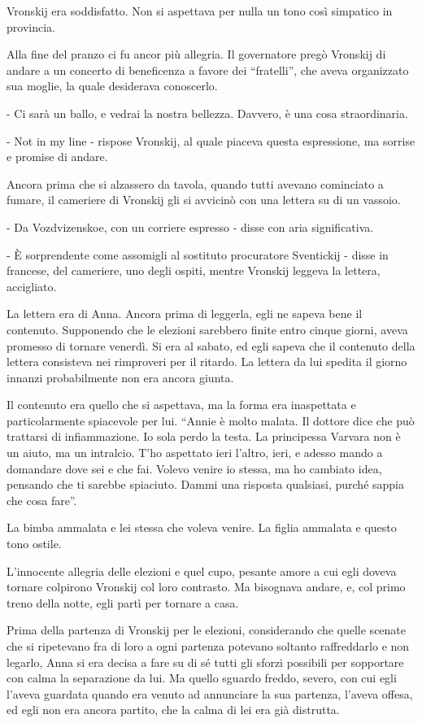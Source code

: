 Vronskij era soddisfatto. Non si aspettava per nulla un tono così simpatico in provincia. 

Alla fine del pranzo ci fu ancor più allegria. Il governatore pregò Vronskij di andare a un concerto di beneficenza a favore dei ``fratelli'', che aveva organizzato sua moglie, la quale desiderava conoscerlo. 

- Ci sarà un ballo, e vedrai la nostra bellezza. Davvero, è una cosa straordinaria. 

- Not in my line - rispose Vronskij, al quale piaceva questa espressione, ma sorrise e promise di andare. 

Ancora prima che si alzassero da tavola, quando tutti avevano cominciato a fumare, il cameriere di Vronskij gli si avvicinò con una lettera su di un vassoio. 

- Da Vozdvizenskoe, con un corriere espresso - disse con aria significativa. 

- È sorprendente come assomigli al sostituto procuratore Sventickij - disse in francese, del cameriere, uno degli ospiti, mentre Vronskij leggeva la lettera, accigliato. 

La lettera era di Anna. Ancora prima di leggerla, egli ne sapeva bene il contenuto. Supponendo che le elezioni sarebbero finite entro cinque giorni, aveva promesso di tornare venerdì. Si era al sabato, ed egli sapeva che il contenuto della lettera consisteva nei rimproveri per il ritardo. La lettera da lui spedita il giorno innanzi probabilmente non era ancora giunta. 

Il contenuto era quello che si aspettava, ma la forma era inaspettata e particolarmente spiacevole per lui. ``Annie è molto malata. Il dottore dice che può trattarsi di infiammazione. Io sola perdo la testa. La principessa Varvara non è un aiuto, ma un intralcio. T'ho aspettato ieri l'altro, ieri, e adesso mando a domandare dove sei e che fai. Volevo venire io stessa, ma ho cambiato idea, pensando che ti sarebbe spiaciuto. Dammi una risposta qualsiasi, purché sappia che cosa fare''. 

La bimba ammalata e lei stessa che voleva venire. La figlia ammalata e questo tono ostile. 

L'innocente allegria delle elezioni e quel cupo, pesante amore a cui egli doveva tornare colpirono Vronskij col loro contrasto. Ma bisognava andare, e, col primo treno della notte, egli partì per tornare a casa. 

Prima della partenza di Vronskij per le elezioni, considerando che quelle scenate che si ripetevano fra di loro a ogni partenza potevano soltanto raffreddarlo e non legarlo, Anna si era decisa a fare su di sé tutti gli sforzi possibili per sopportare con calma la separazione da lui. Ma quello sguardo freddo, severo, con cui egli l'aveva guardata quando era venuto ad annunciare la sua partenza, l'aveva offesa, ed egli non era ancora partito, che la calma di lei era già distrutta. 

